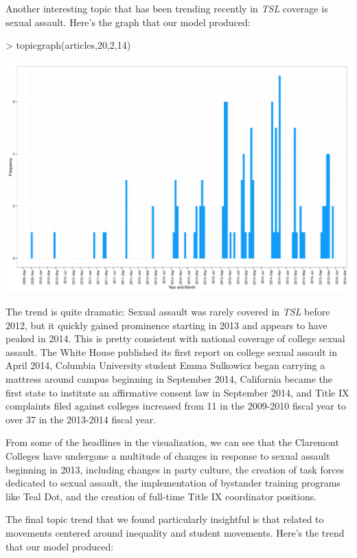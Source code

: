 \documentclass[a4paper]{article}
\begin{document}
Another interesting topic that has been trending recently in \textit{TSL} coverage is sexual assault. Here's the graph that our model produced:

\begin{Schunk}
\begin{Sinput}
> topicgraph(articles,20,2,14)
\end{Sinput}
\end{Schunk}
\includegraphics{FinalProject-008}

The trend is quite dramatic: Sexual assault was rarely covered in \textit{TSL} before 2012, but it quickly gained prominence starting in 2013 and appears to have peaked in 2014. This is pretty consistent with national coverage of college sexual assault. The White House published its first report on college sexual assault in April 2014, Columbia University student Emma Sulkowicz began carrying a mattress around campus beginning in September 2014, California became the first state to institute an affirmative consent law in September 2014, and Title IX complaints filed against colleges increased from 11 in the 2009-2010 fiscal year to over 37 in the 2013-2014 fiscal year.

From some of the headlines in the visualization, we can see that the Claremont Colleges have undergone a multitude of changes in response to sexual assault beginning in 2013, including changes in party culture, the creation of task forces dedicated to sexual assault, the implementation of bystander training programs like Teal Dot, and the creation of full-time Title IX coordinator positions.

The final topic trend that we found particularly insightful is that related to movements centered around inequality and student movements. Here's the trend that our model produced:
\end{document}
